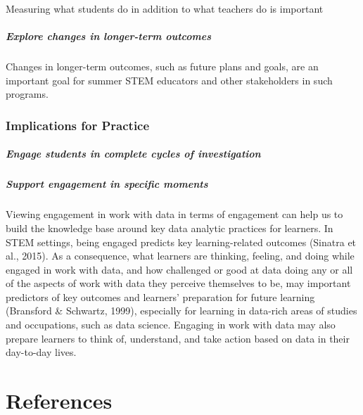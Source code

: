 \documentclass[]{msu-thesis}
\let\oldparagraph\paragraph
\renewcommand{\paragraph}[1]{\oldparagraph{#1}\mbox{}}
\theoremstyle{definition}
\theoremstyle{definition}
\theoremstyle{definition}
\theoremstyle{remark}
\begin{document}
Measuring what students do in addition to what teachers do is important

\paragraph{Explore changes in longer-term
outcomes}\label{explore-changes-in-longer-term-outcomes}

Changes in longer-term outcomes, such as future plans and goals, are an
important goal for summer STEM educators and other stakeholders in such
programs.

\subsection{Implications for Practice}\label{implications-for-practice}

\paragraph{Engage students in complete cycles of
investigation}\label{engage-students-in-complete-cycles-of-investigation}

\paragraph{Support engagement in specific
moments}\label{support-engagement-in-specific-moments}

Viewing engagement in work with data in terms of engagement can help us
to build the knowledge base around key data analytic practices for
learners. In STEM settings, being engaged predicts key learning-related
outcomes (Sinatra et al., 2015). As a consequence, what learners are
thinking, feeling, and doing while engaged in work with data, and how
challenged or good at data doing any or all of the aspects of work with
data they perceive themselves to be, may important predictors of key
outcomes and learners' preparation for future learning (Bransford \&
Schwartz, 1999), especially for learning in data-rich areas of studies
and occupations, such as data science. Engaging in work with data may
also prepare learners to think of, understand, and take action based on
data in their day-to-day lives.

\chapter{References}\label{references}
\end{document}
